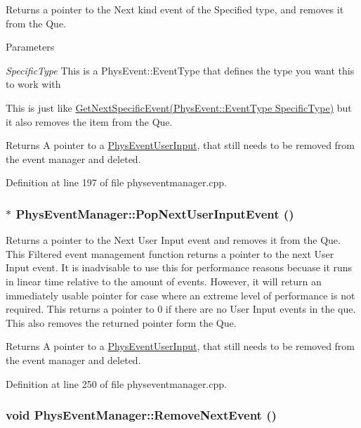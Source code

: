 Returns a pointer to the Next kind event of the Specified type, and removes it from the Que. 
\begin{DoxyParams}{Parameters}
\item[{\em SpecificType}]This is a PhysEvent::EventType that defines the type you want this to work with\end{DoxyParams}
This is just like \hyperlink{classPhysEventManager_a56e45572c2fb84131f7d55c060c7ac21}{GetNextSpecificEvent(PhysEvent::EventType SpecificType)} but it also removes the item from the Que. \begin{DoxyReturn}{Returns}
A pointer to a \hyperlink{classPhysEventUserInput}{PhysEventUserInput}, that still needs to be removed from the event manager and deleted. 
\end{DoxyReturn}


Definition at line 197 of file physeventmanager.cpp.\hypertarget{classPhysEventManager_ad6612a6e1c728941e2c467e7f136ca51}{
\subsubsection[{PopNextUserInputEvent}]{ $\ast$ PhysEventManager::PopNextUserInputEvent ()}}
\label{d5/dd7/classPhysEventManager_ad6612a6e1c728941e2c467e7f136ca51}


Returns a pointer to the Next User Input event and removes it from the Que. This Filtered event management function returns a pointer to the next User Input event. It is inadvisable to use this for performance reasons becuase it runs in linear time relative to the amount of events. However, it will return an immediately usable pointer for case where an extreme level of performance is not required. This returns a pointer to 0 if there are no User Input events in the que. This also removes the returned pointer form the Que. \begin{DoxyReturn}{Returns}
A pointer to a \hyperlink{classPhysEventUserInput}{PhysEventUserInput}, that still needs to be removed from the event manager and deleted. 
\end{DoxyReturn}


Definition at line 250 of file physeventmanager.cpp.\hypertarget{classPhysEventManager_ad040054bd9018ff0fd27ad78ec1e87fa}{
\subsubsection[{RemoveNextEvent}]{\setlength{\rightskip}{0pt plus 5cm}void PhysEventManager::RemoveNextEvent ()}}
\label{d5/dd7/classPhysEventManager_ad040054bd9018ff0fd27ad78ec1e87fa}


